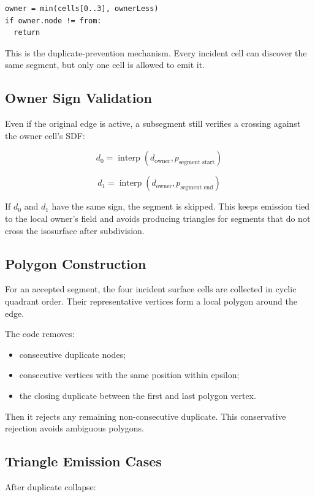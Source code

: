 \documentclass[11pt,a4paper]{article}
\newcommand{\code}[1]{\texttt{\detokenize{#1}}}
\newcommand{\interp}{\operatorname{interp}}
\begin{document}
\begin{lstlisting}
owner = min(cells[0..3], ownerLess)
if owner.node != from:
  return
\end{lstlisting}

This is the duplicate-prevention mechanism. Every incident cell can discover the same segment, but only one cell is allowed to emit it.

\subsection{Owner Sign Validation}

Even if the original \code{from} edge is active, a subsegment still verifies a crossing against the owner cell's SDF:

\[
d_0 = \interp(d_\text{owner}, p_\text{segment start})
\]

\[
d_1 = \interp(d_\text{owner}, p_\text{segment end})
\]

If \(d_0\) and \(d_1\) have the same sign, the segment is skipped. This keeps emission tied to the local owner's field and avoids producing triangles for segments that do not cross the isosurface after subdivision.

\subsection{Polygon Construction}

For an accepted segment, the four incident surface cells are collected in cyclic quadrant order. Their representative vertices form a local polygon around the edge.

The code removes:

\begin{itemize}
    \item consecutive duplicate nodes;
    \item consecutive vertices with the same position within epsilon;
    \item the closing duplicate between the first and last polygon vertex.
\end{itemize}

Then it rejects any remaining non-consecutive duplicate. This conservative rejection avoids ambiguous polygons.

\subsection{Triangle Emission Cases}

After duplicate collapse:
\end{document}
